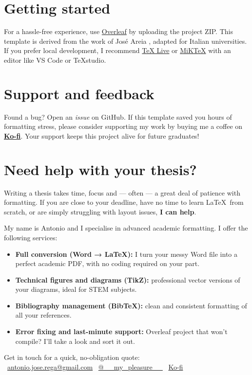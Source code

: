 {	\section{Getting started}
	For a hassle-free experience, use \href{https://www.overleaf.com/}{Overleaf} \citep{Overleaf2024} by uploading the project ZIP. This template is derived from the work of José Areia \citep{IPLeiriaThesis}, adapted for Italian universities. If you prefer local development, I recommend \href{https://www.tug.org/texlive/}{TeX Live} or \href{https://miktex.org/}{MiKTeX} with an editor like VS Code or TeXstudio.
	
	\section{Support and feedback}
	Found a bug? Open an \textit{issue} on GitHub. If this template saved you hours of formatting stress, please consider supporting my work by buying me a coffee on \href{https://ko-fi.com/antoniojosegregoriorega}{\textbf{Ko-fi}}. Your support keeps this project alive for future graduates!
	
	\section{Need help with your thesis?}
	Writing a thesis takes time, focus and — often — a great deal of patience with formatting. If you are close to your deadline, have no time to learn \LaTeX\ from scratch, or are simply struggling with layout issues, \textbf{I can help}.
	
	My name is Antonio and I specialise in advanced academic formatting. I offer the following services:
	
	\begin{itemize}
		\item \textbf{Full conversion (Word → \LaTeX):} I turn your messy Word file into a perfect academic PDF, with no coding required on your part.
		\item \textbf{Technical figures and diagrams (TikZ):} professional vector versions of your diagrams, ideal for STEM subjects.
		\item \textbf{Bibliography management (BibTeX):} clean and consistent formatting of all your references.
		\item \textbf{Error fixing and last-minute support:} Overleaf project that won't compile? I'll take a look and sort it out.
	\end{itemize}
	
	\begin{block}[tip]
		Get in touch for a quick, no-obligation quote: \\
		\faEnvelope\ \href{mailto:antonio.jose.rega@gmail.com}{antonio.jose.rega@gmail.com} \quad
		\faInstagram\ \href{https://www.instagram.com/__my_pleasure__}{@\_\_my\_pleasure\_\_} \quad
		\faHeart\ \href{https://ko-fi.com/antoniojosegregoriorega}{Ko-fi}
	\end{block}
}

\MediaOptionLogicBlank